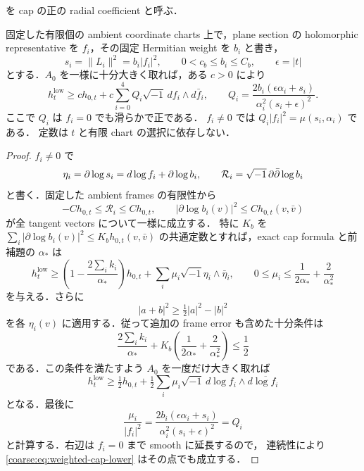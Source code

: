 \documentclass[a4paper,11pt]{ltjsarticle}
\numberwithin{equation}{section}
\theoremstyle{plain}
\theoremstyle{definition}
\theoremstyle{remark}
\begin{document}
を cap の正の radial coefficient と呼ぶ．

\begin{lemma}
\label{coarse:lem:weighted-cap-lower}
固定した有限個の ambient coordinate charts 上で，plane section の holomorphic
representative を $f_i$，その固定 Hermitian weight を $b_i$ と書き，
\[
 s_i=\|L_i\|^2=b_i|f_i|^2,\qquad
 0<c_b\le b_i\le C_b,\qquad \epsilon=|t|
\]
とする．$A_0$ を一様に十分大きく取れば，ある $c>0$ により
\begin{equation}\label{coarse:eq:weighted-cap-lower}
 h_t^{\mathrm{low}}
 \ge c h_{0,t}
   +c\sum_{i=0}^4 Q_i\sqrt{-1}\,df_i\wedge d\bar f_i,
 \qquad
 Q_i=\frac{2b_i(\epsilon\alpha_i+s_i)}
            {\alpha_i^2(s_i+\epsilon)^2}.
\end{equation}
ここで $Q_i$ は $f_i=0$ でも滑らかで正である．
$f_i\ne0$ では $Q_i|f_i|^2=\mu(s_i,\alpha_i)$ である．
定数は $t$ と有限 chart の選択に依存しない．
\end{lemma}

\begin{proof}
$f_i\ne0$ で
\[
 \eta_i=\partial\log s_i=d\log f_i+\partial\log b_i,
 \qquad
 \mathcal R_i=\sqrt{-1}\,\partial\bar\partial\log b_i
\]
と書く．固定した ambient frames の有限性から
\[
 -C h_{0,t}\le\mathcal R_i\le C h_{0,t},
 \qquad
 |\partial\log b_i(v)|^2\le C h_{0,t}(v,\bar v)
\]
が全 tangent vectors について一様に成立する．
特に $K_b$ を
$\sum_i|\partial\log b_i(v)|^2\le K_bh_{0,t}(v,\bar v)$
の共通定数とすれば，exact cap formula と前補題の $\alpha_*$ は
\[
 h_t^{\mathrm{low}}
 \ge\left(1-\frac{2\sum_i k_i}{\alpha_*}\right)h_{0,t}
      +\sum_i\mu_i\sqrt{-1}\eta_i\wedge\bar\eta_i,
 \qquad
 0\le\mu_i\le\frac1{2\alpha_*}+\frac2{\alpha_*^2}
\]
を与える．さらに
\[
 |a+b|^2\ge\tfrac12|a|^2-|b|^2
\]
を各 $\eta_i(v)$ に適用する．従って追加の frame error も含めた十分条件は
\begin{equation}\label{coarse:eq:cap-absorption-budget}
 \frac{2\sum_i k_i}{\alpha_*}
  +K_b\left(\frac1{2\alpha_*}+\frac2{\alpha_*^2}\right)
 \le\frac12
\end{equation}
である．この条件を満たすよう $A_0$ を一度だけ大きく取れば
\[
 h_t^{\mathrm{low}}
 \ge \tfrac12 h_{0,t}
   +\tfrac12\sum_i\mu_i\sqrt{-1}\,
                 d\log f_i\wedge d\overline{\log f_i}
\]
となる．最後に
\[
 \frac{\mu_i}{|f_i|^2}
 =\frac{2b_i(\epsilon\alpha_i+s_i)}
       {\alpha_i^2(s_i+\epsilon)^2}=Q_i
\]
と計算する．右辺は $f_i=0$ まで smooth に延長するので，
連続性により \eqref{coarse:eq:weighted-cap-lower} はその点でも成立する．
\end{proof}
\end{document}
